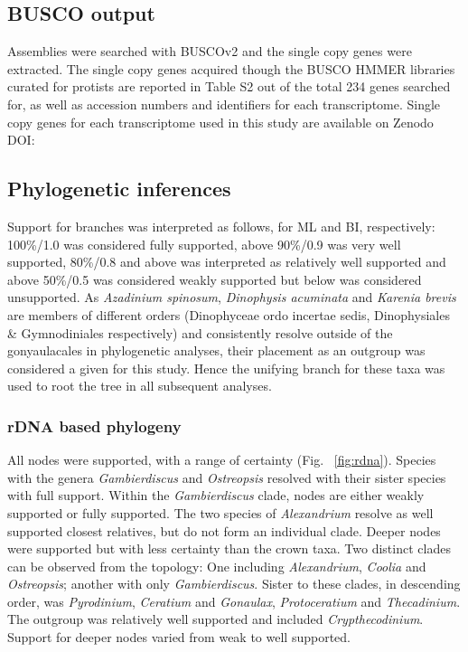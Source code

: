 \documentclass[12pt]{article}
\begin{document}
\subsection*{BUSCO output}
Assemblies were searched with BUSCOv2 and the single copy genes were extracted. 
The single copy genes acquired though the BUSCO HMMER libraries curated for protists are reported in Table S2 out of the total 234 genes searched for, as well as accession numbers and identifiers for each transcriptome. 
Single copy genes for each transcriptome used in this study are available on Zenodo DOI:

\subsection*{Phylogenetic inferences}
Support for branches was interpreted as follows, for ML and BI, respectively: 100\%/1.0 was considered fully supported, above 90\%/0.9 was very well supported, 80\%/0.8 and above was interpreted as relatively well supported and above 50\%/0.5 was considered weakly supported but below was considered unsupported.
As \emph{Azadinium spinosum}, \emph{Dinophysis acuminata} and \emph{Karenia brevis} are members of different orders (Dinophyceae ordo incertae sedis, Dinophysiales \& Gymnodiniales respectively) and consistently resolve outside of the gonyaulacales in phylogenetic analyses, their placement as an outgroup was considered a given for this study. 
Hence the unifying branch for these taxa was used to root the tree in all subsequent analyses.
\subsubsection*{rDNA based phylogeny}
\FloatBarrier 
All nodes were supported, with a range of certainty (Fig. ~\ref{fig:rdna}).
Species with the genera \emph{Gambierdiscus} and \emph{Ostreopsis} resolved with their sister species with full support. 
Within the \emph{Gambierdiscus} clade, nodes are either weakly supported or fully supported. 
The two species of \emph{Alexandrium} resolve as well supported closest relatives, but do not form an individual clade. 
Deeper nodes were supported but with less certainty than the crown taxa. 
Two distinct clades can be observed from the topology: One including \emph{Alexandrium}, \emph{Coolia} and \emph{Ostreopsis}; another with only \emph{Gambierdiscus}. 
Sister to these clades, in descending order, was \emph{Pyrodinium}, \emph{Ceratium} and \emph{Gonaulax}, \emph{Protoceratium} and \emph{Thecadinium}. 
The outgroup was relatively well supported and included \emph{Crypthecodinium}. 
Support for deeper nodes varied from weak to well supported.
\end{document}
